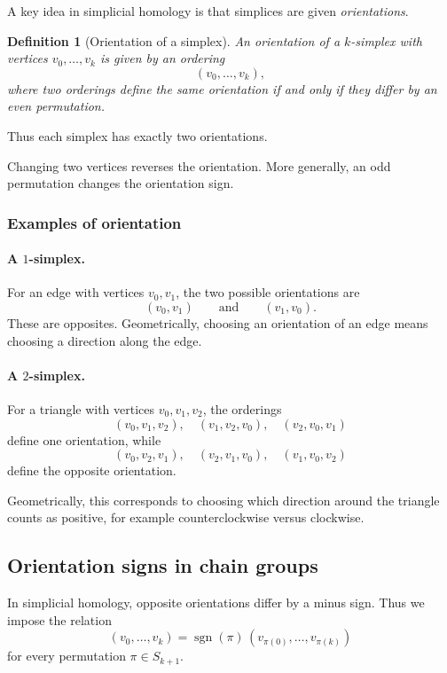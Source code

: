 \documentclass[12pt,a4paper]{article}
\newtheorem{definition}{Definition}[section]
\theoremstyle{notespace}
\begin{document}
A key idea in simplicial homology is that simplices are given \emph{orientations}.

\begin{definition}[Orientation of a simplex]
	An orientation of a \(k\)-simplex with vertices \(v_0,\dots,v_k\) is given by an ordering
	\[
	(v_0,\dots,v_k),
	\]
	where two orderings define the same orientation if and only if they differ by an even permutation.
\end{definition}

Thus each simplex has exactly two orientations.

Changing two vertices reverses the orientation. More generally, an odd permutation changes the orientation sign.

\subsubsection*{Examples of orientation}

\paragraph{A \(1\)-simplex.}
For an edge with vertices \(v_0,v_1\), the two possible orientations are
\[
(v_0,v_1)
\qquad \text{and} \qquad
(v_1,v_0).
\]
These are opposites. Geometrically, choosing an orientation of an edge means choosing a direction along the edge.

\paragraph{A \(2\)-simplex.}
For a triangle with vertices \(v_0,v_1,v_2\), the orderings
\[
(v_0,v_1,v_2),\quad (v_1,v_2,v_0),\quad (v_2,v_0,v_1)
\]
define one orientation, while
\[
(v_0,v_2,v_1),\quad (v_2,v_1,v_0),\quad (v_1,v_0,v_2)
\]
define the opposite orientation.

Geometrically, this corresponds to choosing which direction around the triangle counts as positive, for example counterclockwise versus clockwise.

\subsection{Orientation signs in chain groups}

In simplicial homology, opposite orientations differ by a minus sign. Thus we impose the relation
\[
(v_0,\dots,v_k)=\operatorname{sgn}(\pi)\,(v_{\pi(0)},\dots,v_{\pi(k)})
\]
for every permutation \(\pi\in S_{k+1}\).
\end{document}
